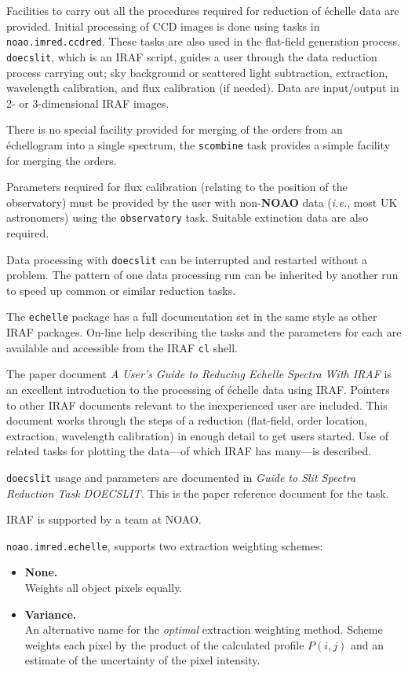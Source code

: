 \documentclass[twoside,11pt]{article}
\newcommand{\htmlref}[2]{#1}
\newcommand{\sgspec}[2]{#1}
\newcommand{\sgspec}[2]{#2}
\begin{document}
Facilities to carry out all the procedures required for reduction of
\'{e}chelle data are provided.  Initial processing of CCD images is done
using tasks in {\tt noao.imred.ccdred}\@.  These tasks are also used in the
flat-field generation process.  {\tt doecslit}, which is an IRAF script,
guides a user through the data reduction process carrying out; sky
background or scattered light subtraction, extraction, wavelength
calibration, and flux calibration (if needed).  Data are input/output in
2- or 3-dimensional IRAF images.

There is no special facility provided for merging of the orders from an
\'{e}chellogram into a single spectrum, the {\tt scombine} task provides
a simple facility for merging the orders.

Parameters required for flux calibration (relating to the position of the
observatory) must be provided by the user with
non-\htmlref{{\bf{NOAO}}}{gl_noao} data ({\em{i.e.}},
most UK astronomers) using the {\tt observatory} task.
Suitable extinction data are also required.

Data processing with {\tt doecslit} can be interrupted and restarted
without a problem.  The pattern of one data processing run can be inherited
by another run to speed up common or similar reduction tasks.

The {\tt echelle} package has a full documentation set in the same style as
other IRAF packages.  On-line help describing the tasks and the parameters
for each are available and accessible from the IRAF {\tt cl} shell.

The paper document {\sl A User's Guide to Reducing Echelle Spectra With
IRAF} is an excellent introduction to the processing of \'{e}chelle data
using IRAF\@.  Pointers to other IRAF documents relevant to the inexperienced
user are included.  This document works through the steps of a reduction
(flat-field, order location, extraction, wavelength calibration) in enough
detail to get users started. Use of related tasks for plotting the
data\sgspec{---}{ - }of which IRAF has many\sgspec{---}{ - }is described.

{\tt doecslit} usage and parameters are documented in {\sl Guide to Slit
Spectra Reduction Task DOECSLIT}\@.  This is the paper reference document
for the task.

IRAF is supported by a team at NOAO\@.

{\tt noao.imred.echelle}, supports two extraction weighting schemes:

\begin{itemize}

\item {\bf{None.}} \mbox{}\\
      Weights all object pixels equally.

\item {\bf{Variance.}} \mbox{}\\
      An alternative name for the {\em optimal} extraction weighting
      method.
      Scheme weights each pixel by the product of the calculated profile
      $P(i,j)$ and an estimate of the uncertainty of the pixel intensity.

\end{itemize}
\end{document}
